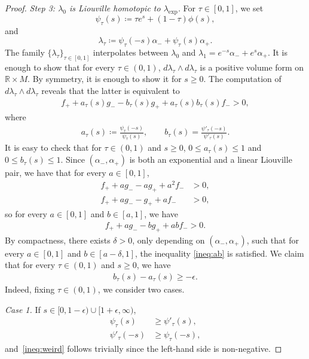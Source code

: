 \documentclass[letterpaper, 11pt]{article}
\numberwithin{equation}{section}
\newcommand{\R}{\mathbb{R}}
\begin{document}
\begin{proof}
\textit{Step 3: $\lambda_0$ is Liouville homotopic to $\lambda_\mathrm{exp}$.}
For $\tau \in [0,1]$, we set $$\psi_\tau(s) \coloneqq \tau e^s + (1-\tau) \phi(s),$$ and 
$$\lambda_\tau \coloneqq \psi_\tau(-s) \alpha_- + \psi_\tau(s) \alpha_+.$$
The family $\{\lambda_\tau\}_{\tau \in [0,1]}$ interpolates between $\lambda_0$ and $\lambda_1=  e^{-s} \alpha_- + e^s \alpha_+$. It is enough to show that for every $\tau \in (0,1)$, $d \lambda_\tau \wedge d\lambda_\tau$ is a positive volume form on $\R \times M$. By symmetry, it is enough to show it for $s \geq 0$. The computation of $d\lambda_\tau \wedge d\lambda_\tau$ reveals that the latter is equivalent to
\begin{align} \label{ineq:atbt}
f_+ + a_\tau(s) g_- - b_\tau(s) g_+ + a_\tau(s)b_\tau(s) f_- > 0,
\end{align}
where
\begin{align*}
a_\tau(s) \coloneqq \frac{\psi_\tau(-s)}{\psi_\tau(s)}, \qquad b_\tau(s) = \frac{\psi'_\tau(-s)}{\psi'_\tau(s)}.
\end{align*}
It is easy to check that for $\tau \in (0,1)$ and $s \geq 0$, $0 \leq a_\tau(s) \leq 1$ and $0 \leq b_\tau(s) \leq 1$.
Since $(\alpha_-, \alpha_+)$ is both an exponential and a linear Liouville pair, we have that for every $a \in [0,1]$,
\begin{align*}
f_+ + a g_- - ag_+ + a^2 f_- &> 0,\\
f_+ + a g_- - g_+ + a f_- &> 0,
\end{align*}
so for every $a \in [0,1]$ and $b \in [a,1]$, we have
\begin{align}
 f_+ + a g_- - bg_+ + ab f_- > 0. \label{ineq:ab}
 \end{align}
By compactness, there exists $\delta > 0$, only depending on $(\alpha_-, \alpha_+)$, such that for every $a \in [0,1]$ and $b \in [a-\delta, 1]$, the inequality \eqref{ineq:ab} is satisfied. We claim that for every $\tau \in (0,1)$ and $s\geq 0$, we have
\begin{align} \label{ineq:weird}
    b_\tau(s) - a_\tau(s) \geq  - \epsilon.
\end{align}
Indeed, fixing $\tau \in (0,1)$, we consider two cases.

\textit{Case 1.} If $s \in [0, 1- \epsilon)\cup [1+\epsilon, \infty)$,
        \begin{align*}
            \psi_\tau(s) &\geq \psi'_\tau(s),\\ 
            \psi'_\tau(-s) &\geq \psi_\tau(-s),
        \end{align*}
        and~\eqref{ineq:weird} follows trivially since the left-hand side is non-negative.


\end{proof}
\end{document}
